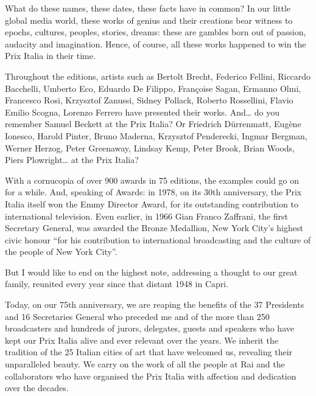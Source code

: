 {{What do these names, these dates, these facts have in common? In our little global media world, these works of genius and their creations bear witness to epochs, cultures, peoples, stories, dreams: these are gambles born out of passion, audacity and imagination. Hence, of course, all these works happened to win the Prix Italia in their time.

Throughout the editions, artists such as Bertolt Brecht, Federico Fellini, Riccardo Bacchelli, Umberto Eco, Eduardo De Filippo, Françoise Sagan, Ermanno Olmi, Francesco Rosi, Krzysztof Zanussi, Sidney Pollack, Roberto Rossellini, Flavio Emilio Scogna, Lorenzo Ferrero have presented their works. And\dots{} do you remember Samuel Beckett at the Prix Italia? Or Friedrich Dürrenmatt, Eugène Ionesco, Harold Pinter, Bruno Maderna, Krzysztof Penderecki, Ingmar Bergman, Werner Herzog, Peter Greenaway, Lindsay Kemp, Peter Brook, Brian Woods, Piers Plowright\dots{} at the Prix Italia?

With a cornucopia of over 900 awards in 75 editions, the examples could go on for a while. And, speaking of Awards: in 1978, on its 30th anniversary, the Prix Italia itself won the Emmy Director Award, for its outstanding contribution to international television. Even earlier, in 1966 Gian Franco Zaffrani, the first Secretary General, was awarded the Bronze Medallion, New York City's highest civic honour ``for his contribution to international broadcasting and the culture of the people of New York City''. 

But I would like to end on the highest note, addressing a thought to our great family, reunited every year since that distant 1948 in Capri. 

Today, on our 75th anniversary, we are reaping the benefits of the 37 Presidents and 16 Secretaries General who preceded me and of the more than 250 broadcasters and hundreds of jurors, delegates, guests and speakers who have kept our Prix Italia alive and ever relevant over the years. We inherit the tradition of the 25 Italian cities of art that have welcomed us, revealing their unparalleled beauty. We carry on the work of all the people at Rai and the collaborators who have organised the Prix Italia with affection and dedication over the decades. 

}}
